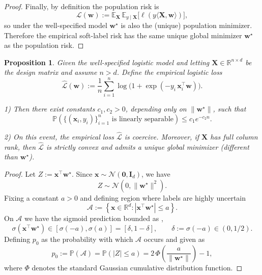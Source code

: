 \documentclass{article}
\theoremstyle{plain}
\newtheorem{proposition}[theorem]{Proposition}
\theoremstyle{definition}
\theoremstyle{remark}
\begin{document}
{\begin{proof}
Finally, by definition the population risk is
\[
\mathcal L(\mathbf w)
:= \mathbb E_{\mathbf X}\,\mathbb E_{y\mid \mathbf X}\!\big[\ell(y\langle \mathbf X,\mathbf w\rangle)\big],
\]
so under the well-specified model $\mathbf w^\star$ is also the (unique) population
minimizer. Therefore the empirical soft-label risk has the same unique global
minimizer $\mathbf w^\star$ as the population risk.
\end{proof}

\begin{proposition}
\label{prop:overdet_nonsep-restate}
Given the well-specified logistic model and letting $\mathbf{X}\in\mathbb{R}^{n\times d}$ be the design matrix and assume $n>d$.
Define the empirical logistic loss
\[
\widehat{\mathcal L}(\mathbf w)
:= \frac{1}{n}\sum_{i=1}^n \log\!\bigl(1+\exp(-y_i\,\mathbf{x}_i^\top \mathbf w)\bigr).
\]

1) Then there exist constants $c_1,c_2>0$, depending only on $\|\mathbf w^\star\|$, such that
\[
\mathbb{P}\!\left(\{(\mathbf{x}_i,y_i)\}_{i=1}^n \text{ is linearly separable}\right)
\le c_1 e^{-c_2 n}.
\]

2) On this event, the empirical loss $\widehat{\mathcal L}$ is coercive.
Moreover, if $\mathbf X$ has full column rank, then $\widehat{\mathcal L}$ is strictly convex and admits a unique global minimizer (different than $\mathbf{w}^{\star}$).
\end{proposition}




\begin{proof}
Let $Z := \mathbf{x}^\top \mathbf{w}^\star$. Since $\mathbf{x}\sim\mathcal{N}(\mathbf{0},\mathbf{I}_d)$, we have
\[
Z \sim \mathcal{N}(0,\|\mathbf{w}^\star\|^2).
\]
Fixing a constant $a>0$ and defining region where labels are highly uncertain
\[
\mathcal{A} := \left\{\mathbf{x}\in\mathbb{R}^d : |\mathbf{x}^\top \mathbf{w}^\star|\le a\right\}.
\]
On $\mathcal{A}$ we have the sigmoid prediction bounded as ,
\[
\sigma(\mathbf{x}^\top \mathbf{w}^\star)\in[\sigma(-a),\sigma(a)]
= [\delta,1-\delta],
\qquad \delta := \sigma(-a)\in(0,1/2).
\]
Defining $p_0$ as the probability with which $\mathcal{A}$ occurs and given as 
\[
p_0 := \mathbb{P}(\mathcal{A})
= \mathbb{P}(|Z|\le a)
= 2\,\Phi\!\left(\frac{a}{\|\mathbf{w}^\star\|}\right)-1,
\]
where $\Phi$ denotes the standard Gaussian cumulative distribution function.



\end{proof}}
\end{document}
